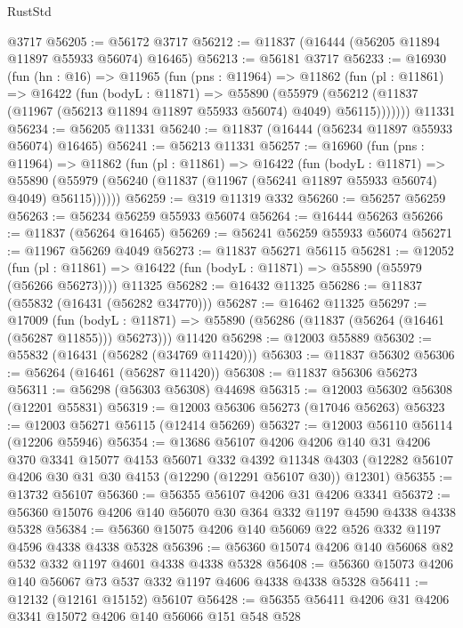 \begin{lexlean}{RustStd}
\begin{coremodule}
    @3717
@56205 := @56172 @3717
@56212 := @11837 (@16444 (@56205 @11894 @11897 @55933 @56074) @16465)
@56213 := @56181 @3717
@56233 := @16930
    (fun (hn : @16) =>
    @11965
      (fun (pns : @11964) =>
      @11862
        (fun (pl : @11861) =>
        @16422
          (fun (bodyL : @11871) =>
          @55890
            (@55979
              (@56212 (@11837 (@11967 (@56213 @11894 @11897 @55933 @56074) @4049) @56115)))))))
    @11331
@56234 := @56205 @11331
@56240 := @11837 (@16444 (@56234 @11897 @55933 @56074) @16465)
@56241 := @56213 @11331
@56257 := @16960
    (fun (pns : @11964) =>
    @11862
      (fun (pl : @11861) =>
      @16422
        (fun (bodyL : @11871) =>
        @55890 (@55979 (@56240 (@11837 (@11967 (@56241 @11897 @55933 @56074) @4049) @56115))))))
@56259 := @319 @11319 @332
@56260 := @56257 @56259
@56263 := @56234 @56259 @55933 @56074
@56264 := @16444 @56263
@56266 := @11837 (@56264 @16465)
@56269 := @56241 @56259 @55933 @56074
@56271 := @11967 @56269 @4049
@56273 := @11837 @56271 @56115
@56281 := @12052
    (fun (pl : @11861) => @16422 (fun (bodyL : @11871) => @55890 (@55979 (@56266 @56273))))
    @11325
@56282 := @16432 @11325
@56286 := @11837 (@55832 (@16431 (@56282 @34770)))
@56287 := @16462 @11325
@56297 := @17009
    (fun (bodyL : @11871) => @55890 (@56286 (@11837 (@56264 (@16461 (@56287 @11855))) @56273)))
    @11420
@56298 := @12003 @55889
@56302 := @55832 (@16431 (@56282 (@34769 @11420)))
@56303 := @11837 @56302
@56306 := @56264 (@16461 (@56287 @11420))
@56308 := @11837 @56306 @56273
@56311 := @56298 (@56303 @56308) @44698
@56315 := @12003 @56302 @56308 (@12201 @55831)
@56319 := @12003 @56306 @56273 (@17046 @56263)
@56323 := @12003 @56271 @56115 (@12414 @56269)
@56327 := @12003 @56110 @56114 (@12206 @55946)
@56354 := @13686
    @56107
    @4206
    @4206
    @140
    @31
    @4206
    @370
    @3341
    @15077
    @4153
    @56071
    @332
    @4392
    @11348
    @4303
    (@12282 @56107 @4206 @30 @31 @30 @4153 (@12290 (@12291 @56107 @30)) @12301)
@56355 := @13732 @56107
@56360 := @56355 @56107 @4206 @31 @4206 @3341
@56372 := @56360 @15076 @4206 @140 @56070 @30 @364 @332 @1197 @4590 @4338 @4338 @5328
@56384 := @56360 @15075 @4206 @140 @56069 @22 @526 @332 @1197 @4596 @4338 @4338 @5328
@56396 := @56360 @15074 @4206 @140 @56068 @82 @532 @332 @1197 @4601 @4338 @4338 @5328
@56408 := @56360 @15073 @4206 @140 @56067 @73 @537 @332 @1197 @4606 @4338 @4338 @5328
@56411 := @12132 (@12161 @15152) @56107
@56428 := @56355
    @56411
    @4206
    @31
    @4206
    @3341
    @15072
    @4206
    @140
    @56066
    @151
    @548
    @528

\end{coremodule}
\end{lexlean}
